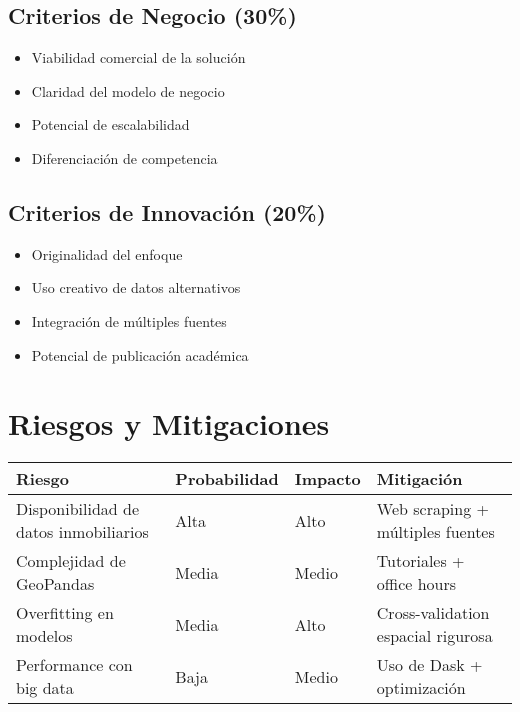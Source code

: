 \documentclass[12pt,a4paper]{article}
\begin{document}
\subsection{Criterios de Negocio (30\%)}

\begin{itemize}
    \item Viabilidad comercial de la solución
    \item Claridad del modelo de negocio
    \item Potencial de escalabilidad
    \item Diferenciación de competencia
\end{itemize}

\subsection{Criterios de Innovación (20\%)}

\begin{itemize}
    \item Originalidad del enfoque
    \item Uso creativo de datos alternativos
    \item Integración de múltiples fuentes
    \item Potencial de publicación académica
\end{itemize}

\section{Riesgos y Mitigaciones}

\begin{center}
\begin{tabular}{|p{3.5cm}|p{3.5cm}|p{3.5cm}|p{3.5cm}|}
\hline
\textbf{Riesgo} & \textbf{Probabilidad} & \textbf{Impacto} & \textbf{Mitigación} \\
\hline
Disponibilidad de datos inmobiliarios & Alta & Alto & Web scraping + múltiples fuentes \\
\hline
Complejidad de GeoPandas & Media & Medio & Tutoriales + office hours \\
\hline
Overfitting en modelos & Media & Alto & Cross-validation espacial rigurosa \\
\hline
Performance con big data & Baja & Medio & Uso de Dask + optimización \\
\hline
\end{tabular}
\end{center}
\end{document}
